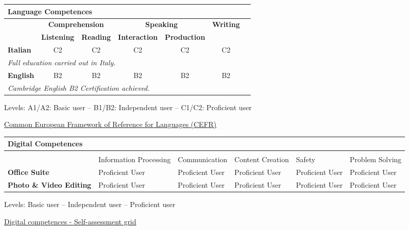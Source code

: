 \documentclass[a4paper, 10pt]{article}
\begin{document}

\centering
\renewcommand{\arraystretch}{1.3}
\begin{tabularx}{\textwidth}{lcccccc}
	\multicolumn{6}{l}{\textbf{{Language Competences}}} \\[4pt]
	\toprule
	& \multicolumn{2}{c}{\textbf{Comprehension}} & \multicolumn{2}{c}{\textbf{Speaking}} & \multicolumn{1}{c}{\textbf{Writing}} \\[3pt]
	\cmidrule(lr){2-3} \cmidrule(lr){4-5}
	& \textbf{Listening} & \textbf{Reading} & \textbf{Interaction} & \textbf{Production} \\
	\midrule
	\textbf{Italian} & C2 & C2 & C2 & C2 & C2 \\
	\multicolumn{6}{l}{\textit{Full education carried out in Italy.}} \\[3pt]
	\textbf{English} & B2 & B2 & B2 & B2 & B2 \\
	\multicolumn{6}{l}{\textit{Cambridge English B2 Certification achieved.}} \\
	\bottomrule
\end{tabularx}

\vspace{4pt}
{\footnotesize
	Levels: A1/A2: Basic user – B1/B2: Independent user – C1/C2: Proficient user \par
	\href{https://europass.europa.eu/system/files/2020-05/CEFR\%20self-assessment\%20grid\%20EN.pdf}{Common European Framework of Reference for Languages (CEFR)}
}\vspace{4pt}

\begin{table}[h!]
	\centering
	\renewcommand{\arraystretch}{1.5}
	\setlength{\tabcolsep}{6pt}
	\begin{tabularx}{\textwidth}{l*{5}{>{\centering\arraybackslash}X}}
		\multicolumn{6}{l}{\textbf{{Digital Competences}}} \\[4pt]
		\hline
		& \multicolumn{5}{c}{\textbf{{SELF-ASSESSMENT}}} \\
		\hline
		& {Information Processing} 
		& {Communication} 
		& {Content Creation}
		& {Safety} 
		& {Problem Solving} \\
		\hline
		\textbf{Office Suite} & Proficient User & Proficient User & Proficient User & Proficient User & Proficient User \\
		\textbf{Photo \& Video Editing} & Proficient User & Proficient User & Proficient User & Proficient User & Proficient User \\
		\hline
	\end{tabularx}
	
	\vspace{4pt}
	{\footnotesize
		{Levels: Basic user – Independent user – Proficient user} \par
		\href{https://www.kutseregister.ee/ctrl/en/Standardid\_Lisa/downloadFile/11204067}{Digital competences - Self-assessment grid}
	}
\end{table}
\end{document}
